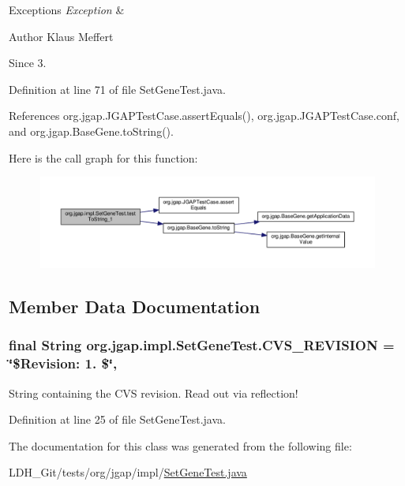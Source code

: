 \begin{DoxyExceptions}{Exceptions}
{\em Exception} & \\
\hline
\end{DoxyExceptions}
\begin{DoxyAuthor}{Author}
Klaus Meffert 
\end{DoxyAuthor}
\begin{DoxySince}{Since}
3. 
\end{DoxySince}


Definition at line 71 of file Set\-Gene\-Test.\-java.



References org.\-jgap.\-J\-G\-A\-P\-Test\-Case.\-assert\-Equals(), org.\-jgap.\-J\-G\-A\-P\-Test\-Case.\-conf, and org.\-jgap.\-Base\-Gene.\-to\-String().



Here is the call graph for this function\-:
\nopagebreak
\begin{figure}[H]
\begin{center}
\leavevmode
\includegraphics[width=350pt]{classorg_1_1jgap_1_1impl_1_1_set_gene_test_a0fb9dca147686f73069f77a77bdaa111_cgraph}
\end{center}
\end{figure}




\subsection{Member Data Documentation}
\hypertarget{classorg_1_1jgap_1_1impl_1_1_set_gene_test_ac60ce9327ed1f7801a4ce0c22ef851e2}{
\subsubsection[{C\-V\-S\-\_\-\-R\-E\-V\-I\-S\-I\-O\-N}]{\setlength{\rightskip}{0pt plus 5cm}final String org.\-jgap.\-impl.\-Set\-Gene\-Test.\-C\-V\-S\-\_\-\-R\-E\-V\-I\-S\-I\-O\-N = \char`\"{}\$Revision\-: 1. \$\char`\"{}\hspace{0.3cm}{\ttfamily [static]}, {\ttfamily [private]}}}\label{classorg_1_1jgap_1_1impl_1_1_set_gene_test_ac60ce9327ed1f7801a4ce0c22ef851e2}
String containing the C\-V\-S revision. Read out via reflection! 

Definition at line 25 of file Set\-Gene\-Test.\-java.



The documentation for this class was generated from the following file\-:\begin{DoxyCompactItemize}
\item 
L\-D\-H\-\_\-\-Git/tests/org/jgap/impl/\hyperlink{_set_gene_test_8java}{Set\-Gene\-Test.\-java}\end{DoxyCompactItemize}
